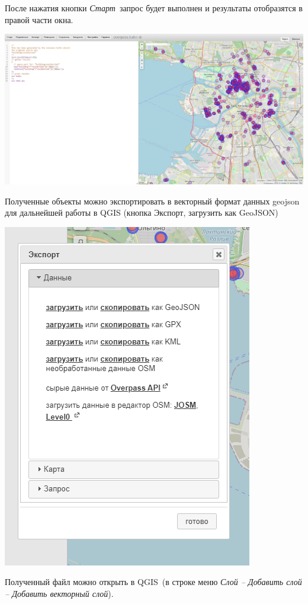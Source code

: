 \documentclass[
]{book}
\begin{document}
После нажатия кнопки \emph{Старт}~запрос будет выполнен и результаты отобразятся в правой части окна.

\includegraphics{figures/36.png}

Полученные объекты можно экспортировать в векторный формат данных geojson для дальнейшей работы в QGIS (кнопка Экспорт, загрузить как GeoJSON)

\includegraphics{figures/37.png}

Полученный файл можно открыть в QGIS~(в строке меню \emph{Слой -- Добавить слой -- Добавить векторный слой}).
\end{document}
